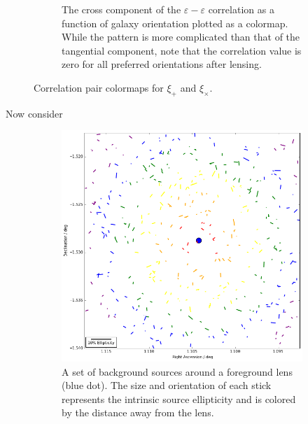 \documentclass[%
 reprint,
 amsmath,amssymb,
 aps,nofootinbib
]{revtex4-1}
\begin{document}
\begin{figure}
\begin{subfigure}[H]{0.45\textwidth}
        \captionsetup{justification=raggedright,singlelinecheck=false}
        \caption{The cross component of the $\varepsilon-\varepsilon$ correlation as a function of galaxy orientation plotted as a colormap. While the pattern is more complicated than that of the tangential component, note that the correlation value is zero for all preferred orientations after lensing.}
        \label{xix_colormap}
    \end{subfigure}
    \caption{Correlation pair colormaps for $\xi_+$ and $\xi_\times$.}
    \label{corr_colormaps}
\end{figure}

Now consider

\begin{figure}[b!]
    \centering
    \begin{subfigure}{0.45\textwidth}
        \includegraphics[width=\textwidth]{figs-swe/corr_visualization_unlensed.png}
        \captionsetup{justification=raggedright,singlelinecheck=false}
        \caption{A set of background sources around a foreground lens (blue dot). The size and orientation of each stick represents the intrinsic source ellipticity and is colored by the distance away from the lens.}
        \label{color_corr_unlensed}
    \end{subfigure}
    ~
    \begin{subfigure}{0.45\textwidth}

\end{subfigure}
\end{figure}
\end{document}
